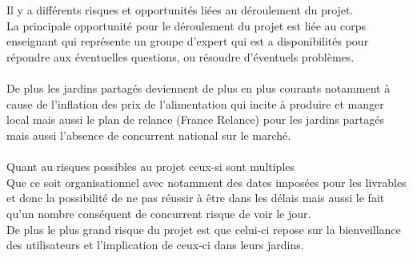 \documentclass{report}
\begin{document}
\section*{\color{orange}{\Large Risques et opportunités}}
Il y a différents risques et opportunités liées au déroulement du projet. \\ 
La principale opportunité pour le déroulement du projet est liée au corps enseignant qui représente un groupe d'expert qui est a disponibilités pour répondre aux éventuelles questions, ou résoudre d'éventuels problèmes. \\ \\ 
De plus les jardins partagés deviennent de plus en plus courants notamment à cause de l'inflation des prix de l’alimentation qui incite à produire et manger local mais aussi le plan de relance (France Relance) pour les jardins partagés mais aussi l'absence de concurrent national sur le marché. \\  \\ 
Quant au risques possibles au projet ceux-si sont multiples  \\ 
Que ce soit organisationnel avec notamment des dates imposées pour les livrables et donc la possibilité de ne pas réussir à être dans les délais mais aussi le fait qu'un nombre conséquent de concurrent risque de voir le jour. \\ 
De plus le plus grand risque du projet est que celui-ci repose sur la bienveillance des utilisateurs et l'implication de ceux-ci dans leurs jardins.
\end{document}
